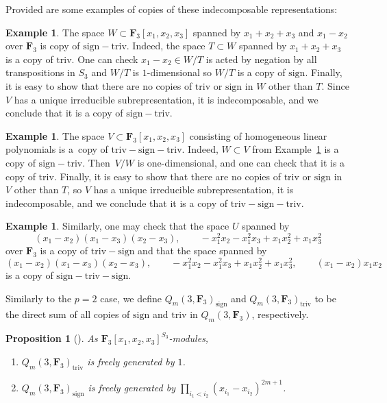 \documentclass[pdftex]{sigma}
\newtheorem{Proposition}[Theorem]{Proposition}
\theoremstyle{definition}
\newtheorem{Example}[Theorem]{Example}
\numberwithin{equation}{section}
\newcommand{\F}{\mathbf{F}}
\newcommand{\sgn}{\mathrm{sign}}
\newcommand{\triv}{\mathrm{triv}}
\newcommand{\sign}{\mathrm{sign}}
\newcommand{\trix}{\mathrm{triv-sign-triv}}
\newcommand{\six}{\mathrm{sign-triv-sign}}
\newcommand{\siv}{\mathrm{sign-triv}}
\newcommand{\tign}{\mathrm{triv-sign}}
\begin{document}
Provided are some examples of copies of these indecomposable representations:

\begin{Example}\label{exSiv}
 The space $W\subset\F_3[x_1,x_2,x_3]$ spanned by $x_1+x_2+x_3$ and $x_1-x_2$ over $\mathbf{F}_3$ is copy of $\siv$. Indeed, the space $T\subset W$ spanned by $x_1+x_2+x_3$ is a copy of $\triv$. One can check $x_1-x_2\in W/T$ is acted by negation by all transpositions in $S_3$ and $W/T$ is $1$-dimensional so $W/T$ is a copy of $\sign$. Finally, it is easy to show that there are no copies of $\triv$ or $\sign$ in $W$ other than $T$. Since $V$ has a unique irreducible subrepresentation, it is indecomposable, and we conclude that it is a copy of $\siv$.
\end{Example}

\begin{Example}\label{deg1polys}
 The space $V\subset\F_3[x_1,x_2,x_3]$ consisting of homogeneous linear polynomials is a~copy of $\trix$. Indeed, $W\subset V$ from Example~\ref{exSiv} is a copy of $\siv$. Then~$V/W$ is one-dimensional, and one can check that it is a copy of $\triv$. Finally, it is easy to show that there are no copies of $\triv$ or $\sign$ in $V$ other than $T$, so $V$ has a unique irreducible subrepresentation, it is indecomposable, and we conclude that it is a copy of $\trix$.
\end{Example}

\begin{Example}
 Similarly, one may check that the space $U$ spanned by
 \[(x_1-x_2)(x_1-x_3)(x_2-x_3),\qquad-x_1^2x_2-x_1^2x_3+x_1x_2^2+x_1x_3^2\]
 over $\mathbf{F}_3$ is a copy of $\tign$ and that the space spanned by
 \[(x_1-x_2)(x_1-x_3)(x_2-x_3),\qquad-x_1^2x_2-x_1^2x_3+x_1x_2^2+x_1x_3^2,\qquad(x_1-x_2)x_1x_2\]
 is a copy of $\six$.
\end{Example}

Similarly to the $p=2$ case, we define $Q_m(3,\mathbf{F}_3)_{\sign}$ and $Q_m(3,\mathbf{F}_3)_{\triv}$ to be the direct sum of all copies of $\sign$ and $\triv$ in $Q_m(3,\mathbf{F}_3)$, respectively.
\begin{Proposition}[\cite{wang2022explicit}]\label{prop:trivsign}
 As $\mathbf{F}_3[x_1,x_2,x_3]^{S_3}$-modules,
 \begin{enumerate}\itemsep=0pt
 \item[$1$.] $Q_m(3,\mathbf{F}_3)_\triv$ is freely generated by $1$.
 \item[$2$.] $Q_m(3,\mathbf{F}_3)_\sgn$ is freely generated by $\prod_{i_1<i_2}(x_{i_1}-x_{i_2})^{2m+1}$.
 \end{enumerate}
\end{Proposition}
\end{document}
